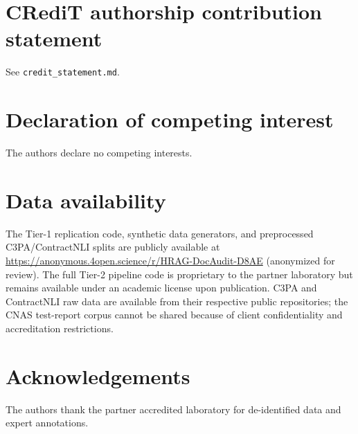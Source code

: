 \section*{CRediT authorship contribution statement}
See \texttt{credit\_statement.md}.

\section*{Declaration of competing interest}
The authors declare no competing interests.

\section*{Data availability}
The Tier-1 replication code, synthetic data generators, and preprocessed C3PA/ContractNLI splits are publicly available at \url{https://anonymous.4open.science/r/HRAG-DocAudit-D8AE} (anonymized for review). The full Tier-2 pipeline code is proprietary to the partner laboratory but remains available under an academic license upon publication. C3PA and ContractNLI raw data are available from their respective public repositories; the CNAS test-report corpus cannot be shared because of client confidentiality and accreditation restrictions.

\section*{Acknowledgements}
The authors thank the partner accredited laboratory for de-identified data and expert annotations. 
